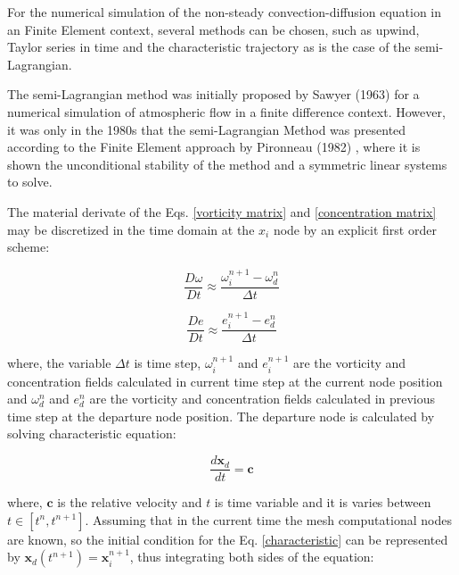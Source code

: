 For the numerical simulation of the 
non-steady convection-diffusion equation 
in an Finite Element context, several methods can be chosen, 
such as upwind, Taylor series in time and 
the characteristic trajectory as is the case of the semi-Lagrangian.

\medskip
The semi-Lagrangian method was initially proposed by 
Sawyer (1963) \cite{sawyer1963} for a numerical simulation 
of atmospheric flow in a finite difference context. 
However, it was only in the 1980s that the 
semi-Lagrangian Method was presented according to 
the Finite Element approach by 
Pironneau (1982) \cite{pironneau1982},
where it is shown the unconditional stability of the method and 
a symmetric linear systems to solve.

\medskip
The material derivate of the Eqs. \ref{vorticity matrix} and \ref{concentration matrix} may be discretized in the time
domain at the $x_{i}$ node by an explicit first order scheme:



\vspace{-0.4cm}
\begin{equation} \label{material vorticity discretization}
 \frac{D \omega}{D t} \approx 
 \frac{\omega_{i}^{n+1} - \omega_{d}^{n}}{\Delta t}
\end{equation}

\vspace{-0.8cm}
\begin{equation} \label{material concentration discretization}
 \frac{D e}{D t} \approx
 \frac{e_{i}^{n+1} - e_{d}^{n}}{\Delta t}
\end{equation}


\medskip
\noindent
where, 
the variable $\Delta t$ is time step, 
$\omega_{i}^{n+1}$ and $e_{i}^{n+1}$ are the vorticity and 
concentration fields calculated in current time step at the current 
node position and
$\omega_{d}^{n}$ and $e_{d}^{n}$ are the vorticity and 
concentration fields calculated in previous time step 
at the departure node position.
The departure node is calculated by solving characteristic equation:

\begin{equation} \label{characteristic}
\frac{d\textbf{x}_{d}}{dt} = \textbf{c}
\end{equation}

\medskip
\noindent
where,
$\textbf{c}$ is the relative velocity and
$t$ is time variable and 
it is varies between $t \in \left[t^{n},t^{n+1}\right]$.
Assuming that in the current time the mesh computational nodes
are known, so the initial condition for the Eq. \ref{characteristic}
can be represented by $\textbf{x}_{d}(t^{n+1}) = \textbf{x}_{i}^{n+1}$,
thus integrating both sides of the equation:

